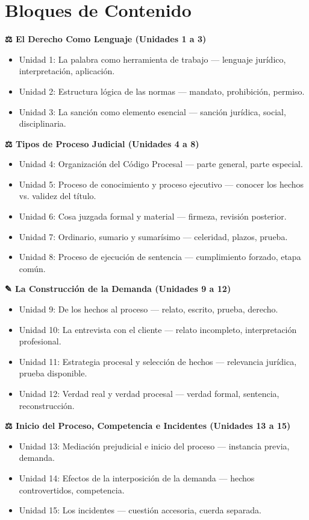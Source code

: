 \documentclass[12pt,oneside]{book}
\begin{document}
\section*{Bloques de Contenido}

\textbf{⚖ El Derecho Como Lenguaje (Unidades 1 a 3)}
\begin{itemize}
    \item Unidad 1: La palabra como herramienta de trabajo --- lenguaje jurídico, interpretación, aplicación.
    \item Unidad 2: Estructura lógica de las normas --- mandato, prohibición, permiso.
    \item Unidad 3: La sanción como elemento esencial --- sanción jurídica, social, disciplinaria.
\end{itemize}

\textbf{⚖ Tipos de Proceso Judicial (Unidades 4 a 8)}
\begin{itemize}
    \item Unidad 4: Organización del Código Procesal --- parte general, parte especial.
    \item Unidad 5: Proceso de conocimiento y proceso ejecutivo --- conocer los hechos vs. validez del título.
    \item Unidad 6: Cosa juzgada formal y material --- firmeza, revisión posterior.
    \item Unidad 7: Ordinario, sumario y sumarísimo --- celeridad, plazos, prueba.
    \item Unidad 8: Proceso de ejecución de sentencia --- cumplimiento forzado, etapa común.
\end{itemize}

\textbf{✎ La Construcción de la Demanda (Unidades 9 a 12)}
\begin{itemize}
    \item Unidad 9: De los hechos al proceso --- relato, escrito, prueba, derecho.
    \item Unidad 10: La entrevista con el cliente --- relato incompleto, interpretación profesional.
    \item Unidad 11: Estrategia procesal y selección de hechos --- relevancia jurídica, prueba disponible.
    \item Unidad 12: Verdad real y verdad procesal --- verdad formal, sentencia, reconstrucción.
\end{itemize}

\textbf{⚖ Inicio del Proceso, Competencia e Incidentes (Unidades 13 a 15)}
\begin{itemize}
    \item Unidad 13: Mediación prejudicial e inicio del proceso --- instancia previa, demanda.
    \item Unidad 14: Efectos de la interposición de la demanda --- hechos controvertidos, competencia.
    \item Unidad 15: Los incidentes --- cuestión accesoria, cuerda separada.
\end{itemize}
\end{document}

